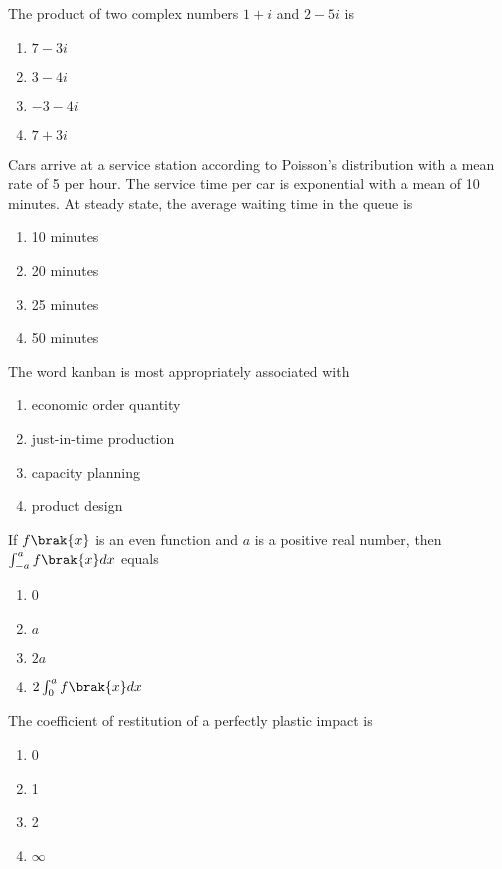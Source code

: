     		 

	
	\item
	The product of two complex numbers $1+i$ and $2-5i$ is
		\begin{enumerate}
			\item $7-3i$
			\item $3-4i$
			\item $-3-4i$
			\item $7+3i$
		\end{enumerate}
	\item
	Cars arrive at a service station according to Poisson's distribution with a mean rate of 5 per hour. The service time per car is exponential with a mean of 10 minutes. At steady state, the average waiting time in the queue is
		\begin{enumerate}
			\item 10 minutes
			\item 20 minutes
			\item 25 minutes
			\item 50 minutes
		\end{enumerate}
	\item
	The word kanban is most appropriately associated with
		\begin{enumerate}
			\item economic order quantity
			\item just-in-time production
			\item capacity planning
			\item product design
		\end{enumerate}
	\item
	If $f\brak{x}$ is an even function and $a$ is a positive real number, then $\int_{-a}^{a} f\brak{x} dx$ equals
		\begin{enumerate}
			\item 0
			\item $a$
			\item $2a$
			\item $2 \int_{0}^{a} f\brak{x} dx$
		\end{enumerate}
	\item
	The coefficient of restitution of a perfectly plastic impact is
		\begin{enumerate}
			\item 0
			\item 1
			\item 2
			\item $\infty$
		\end{enumerate}
